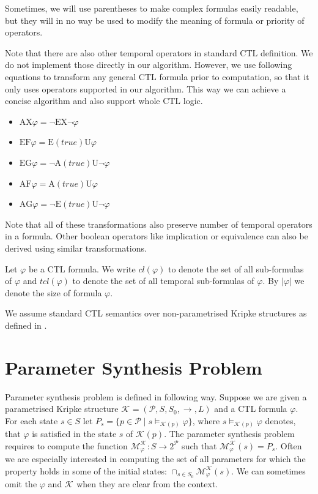\documentclass[12pt,oneside]{fithesis2}
\newcommand{\ks}[1][]{\ensuremath{\mathcal{K}_{#1}}}
\newcommand{\fullKs}{\ensuremath{ \ks = (\params, S, S_0, \trans{}, L) }}
\newcommand{\trans}[1]{\stackrel{#1}{\rightarrow}}
\newcommand{\params}{\mathcal{P}}
\newcommand{\eu}[2]{\ensuremath{\mbox{E} #1 \mbox{U} #2 }}
\newcommand{\au}[2]{\ensuremath{\mbox{A} #1 \mbox{U} #2 }}
\newcommand{\ex}[1]{\ensuremath{\mbox{EX} #1}}
\newcommand{\ax}[1]{\ensuremath{\mbox{AX} #1}}
\newcommand{\ef}[1]{\ensuremath{\mbox{EF} #1}}
\newcommand{\af}[1]{\ensuremath{\mbox{AF} #1}}
\newcommand{\eg}[1]{\ensuremath{\mbox{EG} #1}}
\newcommand{\ag}[1]{\ensuremath{\mbox{AG} #1}}
\begin{document}
			Sometimes, we will use parentheses to make complex formulas easily readable, but they will in no way be used to modify the meaning of formula or priority of operators.
			
			Note	 that there are also other temporal operators in standard CTL definition. We do not implement those directly in our algorithm. However, we use following equations to transform any general CTL formula prior to computation, so that it only uses operators supported in our algorithm. This way we can achieve a concise algorithm and also support whole CTL logic.
			
			\begin{itemize}
				\item $ \ax{\varphi} = \neg \ex{ \neg \varphi } $
				\item $ \ef{\varphi} = \eu{(true)}{\varphi} $
				\item $ \eg{\varphi} = \neg \au{(true)}{\neg \varphi} $
				\item $ \af{\varphi} = \au{(true)}{\varphi} $
				\item $ \ag{\varphi} = \neg \eu{(true)}{\neg \varphi}$
			\end{itemize}
			
			Note that all of these transformations also preserve number of temporal operators in a formula. Other boolean operators like implication or equivalence can also be derived using similar transformations. 			
			
			Let $\varphi$ be a CTL formula. We write $cl(\varphi)$ to denote the set of all sub-formulas of $\varphi$ and $tcl(\varphi)$ to denote the set of all temporal sub-formulas of $\varphi$. By $|\varphi|$ we denote the size of formula $\varphi$.
			
			We assume standard CTL semantics over non-parametrised Kripke structures as defined in \cite{clarke}.

		\section{Parameter Synthesis Problem}
			
			Parameter synthesis problem is defined in following way. Suppose we are given a parametrised Kripke structure $\fullKs$ and a CTL formula $\varphi$. For each state $s \in S$ let $ P_s = \{ p \in \params \mid s \models_{\ks(p)} \varphi \} $, where $s \models_{\ks(p)} \varphi$ denotes, that $\varphi$ is satisfied in the state $s$ of $\ks(p)$. The parameter synthesis problem requires to compute the function $\mathcal{M}_{\varphi}^{\ks} : S \rightarrow 2^\params $ such that $\mathcal{M}_{\varphi}^{\ks}(s) = P_s$. Often we are especially interested in computing the set of all parameters for which the property holds in some of the initial states: $\cap_{s\in S_0}\mathcal{M}_\varphi^{\mathcal K}(s)$. We can sometimes omit the $\varphi$ and $\ks$ when they are clear from the context.	
				
\end{document}
